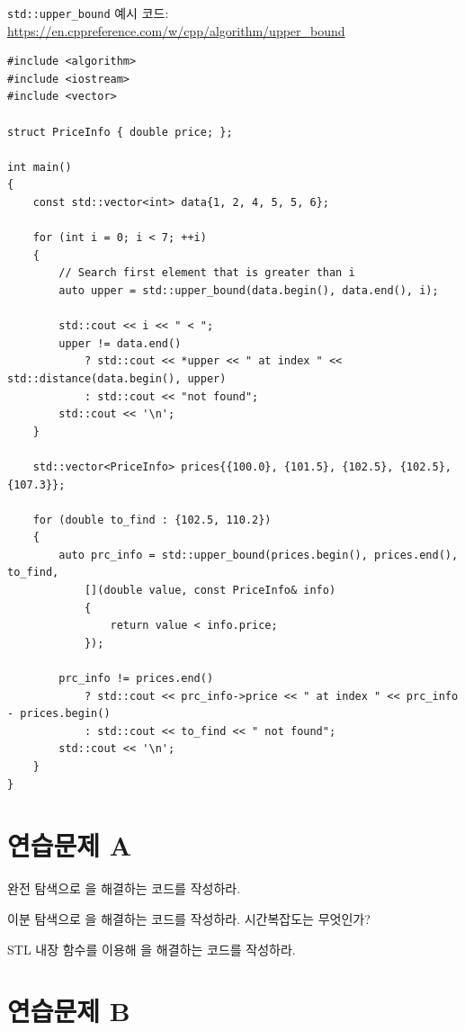 \begin{code} \label{code: upper_bound}
\texttt{std::upper\_bound} 예시 코드: \url{https://en.cppreference.com/w/cpp/algorithm/upper_bound}
\begin{lstlisting}
#include <algorithm>
#include <iostream>
#include <vector>
    
struct PriceInfo { double price; };
    
int main()
{
    const std::vector<int> data{1, 2, 4, 5, 5, 6};
    
    for (int i = 0; i < 7; ++i)
    {
        // Search first element that is greater than i
        auto upper = std::upper_bound(data.begin(), data.end(), i);
    
        std::cout << i << " < ";
        upper != data.end()
            ? std::cout << *upper << " at index " << std::distance(data.begin(), upper)
            : std::cout << "not found";
        std::cout << '\n';
    }
    
    std::vector<PriceInfo> prices{{100.0}, {101.5}, {102.5}, {102.5}, {107.3}};
    
    for (double to_find : {102.5, 110.2})
    {
        auto prc_info = std::upper_bound(prices.begin(), prices.end(), to_find,
            [](double value, const PriceInfo& info)
            {
                return value < info.price;
            });
    
        prc_info != prices.end()
            ? std::cout << prc_info->price << " at index " << prc_info - prices.begin()
            : std::cout << to_find << " not found";
        std::cout << '\n';
    }
}
\end{lstlisting}
\end{code}

\section{연습문제 A}
\begin{problem}
    완전 탐색으로 을 해결하는 코드를 작성하라.
\end{problem}
\begin{problem}
    이분 탐색으로 을 해결하는 코드를 작성하라. 시간복잡도는 무엇인가?
\end{problem}
\begin{problem}
    STL 내장 함수를 이용해 을 해결하는 코드를 작성하라.
\end{problem}

\section{연습문제 B}

